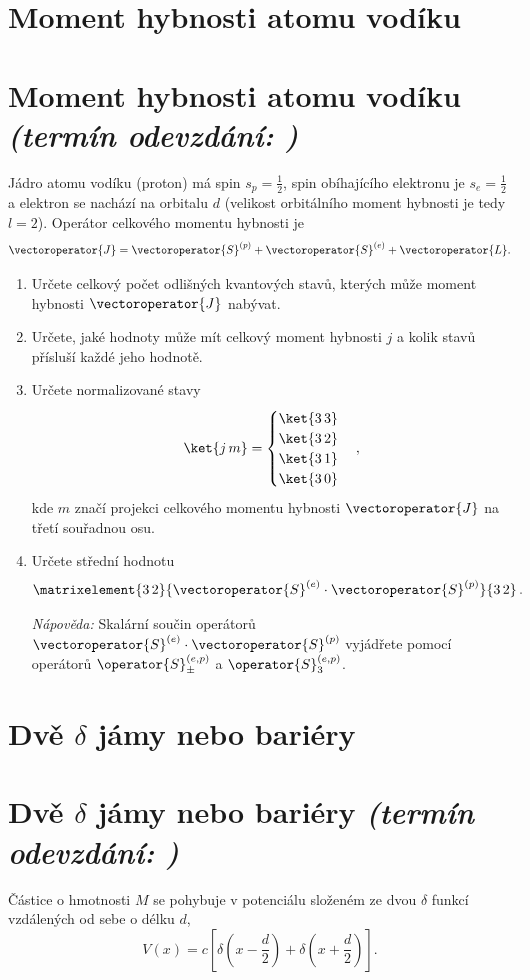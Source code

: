 \documentclass[a4paper,11pt,twoside]{book}
\def\np{\newpage}
\newcommand{\exercise}[2][]{\ifthenelse{\isempty{#1}}
	{\np\section{#2}}
	{\np\section[#2]{{#2} \small{\it{(termín odevzdání: {#1})}}}}
}
\begin{document}
\exercise{Moment hybnosti atomu vodíku}
    Jádro atomu vodíku (proton) má spin $s_{p}=\frac{1}{2}$, spin obíhajícího elektronu je $s_{e}=\frac{1}{2}$ a elektron se nachází na orbitalu $d$ (velikost orbitálního moment hybnosti je tedy $l=2$).
    Operátor celkového momentu hybnosti je
    \begin{equation*}
        \vectoroperator{J}=\vectoroperator{S}^{(p)}+\vectoroperator{S}^{(e)}+\vectoroperator{L}.
    \end{equation*}
    
    \begin{enumerate}
    \item
        Určete celkový počet odlišných kvantových stavů, kterých může moment hybnosti $\vectoroperator{J}$ nabývat.
        
    \item
        Určete, jaké hodnoty může mít celkový moment hybnosti $j$ a kolik stavů přísluší každé jeho hodnotě.
        
    \item
        Určete normalizované stavy
        \begin{equation*}
            \ket{j\,m}=\begin{cases}\ket{3\,3} \\ \ket{3\,2} \\ \ket{3\,1} \\ \ket{3\,0}\end{cases},
        \end{equation*}
        kde $m$ značí projekci celkového momentu hybnosti $\vectoroperator{J}$ na třetí souřadnou osu.
        
    \item
        Určete střední hodnotu
        \begin{equation*}
            \matrixelement{3\,2}{\vectoroperator{S}^{(e)}\cdot\vectoroperator{S}^{(p)}}{3\,2}\,.
        \end{equation*}

\emph{Nápověda:}
    Skalární součin operátorů $\vectoroperator{S}^{(e)}\cdot\vectoroperator{S}^{(p)}$ vyjádřete pomocí
    operátorů $\operator{S}^{(e,p)}_{\pm}$ a $\operator{S}^{(e,p)}_{3}$.	
    \end{enumerate}

\exercise{Dvě $\delta$ jámy nebo bariéry}
    Částice o hmotnosti $M$ se pohybuje v potenciálu složeném ze dvou $\delta$ funkcí vzdálených od sebe o délku $d$,
    \begin{equation*}
        V(x)=c\left[\delta\left(x-\frac{d}{2}\right)+\delta\left(x+\frac{d}{2}\right)\right].
    \end{equation*}
    
\end{document}
